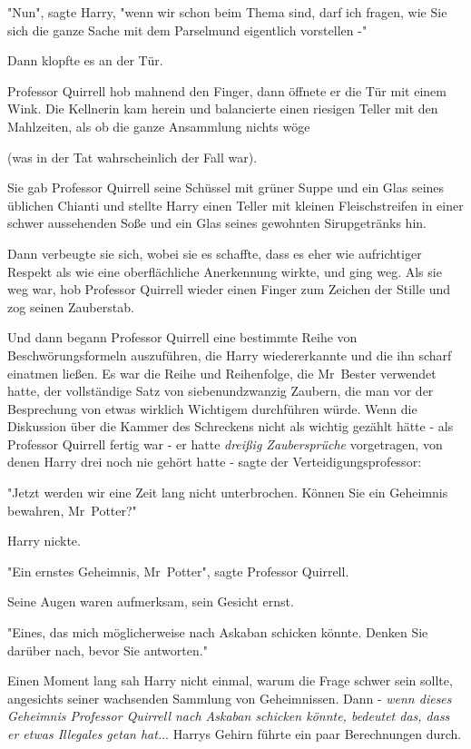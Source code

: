 {"Nun", sagte Harry, "wenn wir schon beim Thema sind, darf ich fragen, wie Sie sich die ganze Sache mit dem Parselmund eigentlich vorstellen -"

Dann klopfte es an der Tür.

Professor Quirrell hob mahnend den Finger, dann öffnete er die Tür mit einem Wink. Die Kellnerin kam herein und balancierte einen riesigen Teller mit den Mahlzeiten, als ob die ganze Ansammlung nichts wöge

(was in der Tat wahrscheinlich der Fall war).

Sie gab Professor Quirrell seine Schüssel mit grüner Suppe und ein Glas seines üblichen Chianti und stellte Harry einen Teller mit kleinen Fleischstreifen in einer schwer aussehenden Soße und ein Glas seines gewohnten Sirupgetränks hin.

Dann verbeugte sie sich, wobei sie es schaffte, dass es eher wie aufrichtiger Respekt als wie eine oberflächliche Anerkennung wirkte, und ging weg. Als sie weg war, hob Professor Quirrell wieder einen Finger zum Zeichen der Stille und zog seinen Zauberstab.

Und dann begann Professor Quirrell eine bestimmte Reihe von Beschwörungsformeln auszuführen, die Harry wiedererkannte und die ihn scharf einatmen ließen. Es war die Reihe und Reihenfolge, die Mr~Bester verwendet hatte, der vollständige Satz von siebenundzwanzig Zaubern, die man vor der Besprechung von etwas wirklich Wichtigem durchführen würde. Wenn die Diskussion über die Kammer des Schreckens nicht als wichtig gezählt hätte - als Professor Quirrell fertig war - er hatte \emph{dreißig Zaubersprüche} vorgetragen, von denen Harry drei noch nie gehört hatte - sagte der Verteidigungsprofessor:

"Jetzt werden wir eine Zeit lang nicht unterbrochen. Können Sie ein Geheimnis bewahren, Mr~Potter?"

Harry nickte.

"Ein ernstes Geheimnis, Mr~Potter", sagte Professor Quirrell.

Seine Augen waren aufmerksam, sein Gesicht ernst.

"Eines, das mich möglicherweise nach Askaban schicken könnte. Denken Sie darüber nach, bevor Sie antworten."

Einen Moment lang sah Harry nicht einmal, warum die Frage schwer sein sollte, angesichts seiner wachsenden Sammlung von Geheimnissen. Dann - \emph{wenn dieses Geheimnis Professor Quirrell nach Askaban schicken könnte, bedeutet das, dass er etwas Illegales getan hat.}.. Harrys Gehirn führte ein paar Berechnungen durch.

}
